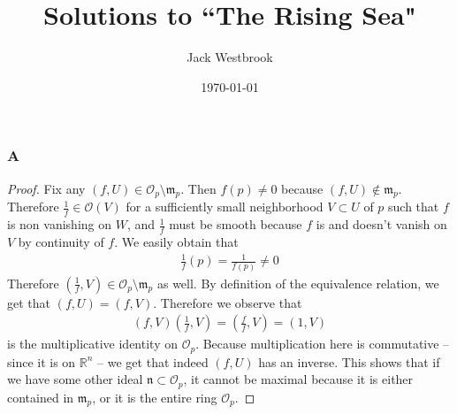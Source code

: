 \documentclass{article}
\title{Solutions to ``The Rising Sea"}
\author{Jack Westbrook}
\date\today
\newcommand{\R}{\mathbb{R}}
\newcommand{\fO}{\mathscr{O}}
\begin{document}
\maketitle %

\section{}
\subsection{}
\subsubsection{A}\label{2.1.A}
\begin{proof}
    Fix any $(f,U)\in \fO_p\setminus \mathfrak{m}_p$. Then $f(p)\ne 0$ because $(f,U)\notin \mathfrak{m}_p$. Therefore $\frac{1}{f}\in \fO(V)$ for a sufficiently small neighborhood $V\subset U$ of $p$ such that $f$ is non vanishing on $W$, and $\frac{1}{f}$ must be smooth because $f$ is and doesn't vanish on $V$ by continuity of $f$. We easily obtain that
    \begin{align*}
        \frac{1}{f}(p)=\frac{1}{f(p)} \ne 0
    \end{align*}
    Therefore $(\frac{1}{f},V)\in \fO_p\setminus \mathfrak{m}_p$ as well. By definition of the equivalence relation, we get that $(f,U)=(f,V)$. Therefore we observe that
    \begin{align*}
        (f,V)(\frac{1}{f},V)=(\frac{f}{f},V)=(1,V)
    \end{align*}
    is the multiplicative identity on $\fO_p$. Because multiplication here is commutative --since it is on $\R^n$ -- we get that indeed $(f,U)$ has an inverse. This shows that if we have some other ideal $\mathfrak{n}\subset \fO_p$, it cannot be maximal because it is either contained in $\mathfrak{m}_p$, or it is the entire ring $\fO_p$.
\end{proof}
\end{document}
